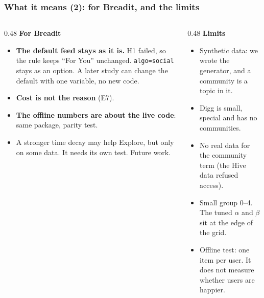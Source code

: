 \documentclass[aspectratio=169,11pt]{beamer}
\begin{document}
\begin{frame}
  \frametitle{What it means (2): for Breadit, and the limits}
  \begin{columns}[T]
    \begin{column}{0.48\textwidth}
      \textbf{For Breadit}
      \begin{itemize}\small
        \item \textbf{The default feed stays as it is.} H1 failed, so the rule keeps ``For You'' unchanged. \texttt{algo=social} stays as an option. A later study can change the default with one variable, no new code.
        \item \textbf{Cost is not the reason} (E7).
        \item \textbf{The offline numbers are about the live code}: same package, parity test.
        \item A stronger time decay may help Explore, but only on some data. It needs its own test. Future work.
      \end{itemize}
    \end{column}
    \begin{column}{0.48\textwidth}
      \textbf{Limits}
      \begin{itemize}\small
        \item Synthetic data: we wrote the generator, and a community is a topic in it.
        \item Digg is small, special and has no communities.
        \item No real data for the community term (the Hive data refused access).
        \item Small group 0--4. The tuned $\alpha$ and $\beta$ sit at the edge of the grid.
        \item Offline test: one item per user. It does not measure whether users are happier.
      \end{itemize}
    \end{column}
  \end{columns}
\end{frame}
\end{document}
